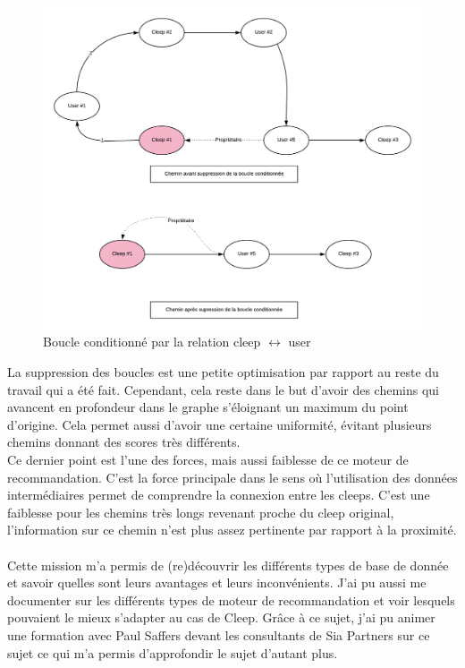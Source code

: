 \documentclass{article} %
\begin{document}
\begin{figure}[!h]
	\centering
	\includegraphics[keepaspectratio = true,scale=0.6]{bbb}
	\caption{Boucle conditionné par la relation cleep $\leftrightarrow$ user}
	\label{fig:bbb}
\end{figure}

La suppression des boucles est une petite optimisation par rapport au reste du travail qui a été fait. Cependant, cela reste dans le but d'avoir des chemins qui avancent en profondeur dans le graphe s'éloignant un maximum du point d'origine. Cela permet aussi d'avoir une certaine uniformité, évitant plusieurs chemins donnant des scores très différents.\\
Ce dernier point est l'une des forces, mais aussi faiblesse de ce moteur de recommandation. C'est la force principale dans le sens où l'utilisation des données intermédiaires permet de comprendre la connexion entre les cleeps. C'est une faiblesse pour les chemins très longs revenant proche du cleep original, l'information sur ce chemin n'est plus assez pertinente par rapport à la proximité.\\ \\

Cette mission m'a permis de (re)découvrir les différents types de base de donnée et savoir quelles sont leurs avantages et leurs inconvénients. J'ai pu aussi me documenter sur les différents types de moteur de recommandation et voir lesquels pouvaient le mieux s'adapter au cas de Cleep. Grâce à ce sujet, j'ai pu animer une formation avec Paul Saffers devant les consultants de Sia Partners sur ce sujet ce qui m'a permis d'approfondir le sujet d'autant plus. 
\end{document}

